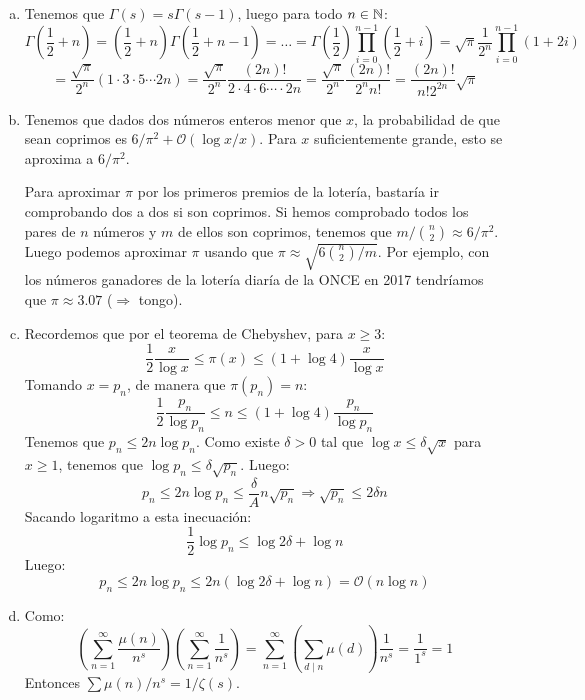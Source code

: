 \documentclass[twoside]{article}
\providecommand{\bo}[1]{\mathcal{O}\left(#1\right)}
\begin{document}
\begin{solucion}
\begin{enumerate}[(a)]
\item Tenemos que $Γ(s)=sΓ(s-1)$, luego para todo $n \in \mathbb{N}$:
	\[ Γ\left(\frac{1}{2}+n\right) = \left(\frac{1}{2}+n\right) Γ\left(\frac{1}{2}+n-1\right) = \dots = Γ\left(\frac{1}{2}\right)\prod_{i=0}^{n-1}\left(\frac{1}{2}+i\right) = \sqrt{π}\frac{1}{2^n}\prod_{i=0}^{n-1}\left(1+2i\right)\]
	\[ = \frac{\sqrt{π}}{2^n}(1 \cdot 3 \cdot 5 \cdots 2n) = \frac{\sqrt{π}}{2^n}\frac{(2n)!}{2 \cdot 4 \cdot 6 \cdots \cdot 2n} = \frac{\sqrt{π}}{2^n}\frac{(2n)!}{2^n n!}  = \frac{(2n)!}{n!2^{2n}}\sqrt{π} \]
	
\item Tenemos que dados dos números enteros menor que $x$, la probabilidad de que sean coprimos es $6/π^2+\bo{\log x/x}$.
	Para $x$ suficientemente grande, esto se aproxima a $6/π^2$.
	
Para aproximar $π$ por los primeros premios de la lotería, bastaría ir comprobando dos a dos si son coprimos.
Si hemos comprobado todos los pares de $n$ números y $m$ de ellos son coprimos, tenemos que $m/\binom{n}{2} \approx 6/π^2$.
Luego podemos aproximar $π$ usando que $π \approx \sqrt{6\binom{n}{2}/m}$.
Por ejemplo, con los números ganadores de la lotería diaría de la ONCE en 2017 tendríamos que $π \approx 3.07$ ($\Rightarrow$ tongo).

\item Recordemos que por el teorema de Chebyshev, para $x ≥ 3$:
\[ \frac{1}{2} \frac{x}{\log x} ≤ π(x) ≤ (1 + \log 4)\frac{x}{\log x} \]
Tomando $x = p_n$, de manera que $π(p_n)=n$:
\[ \frac{1}{2} \frac{p_n}{\log p_n} ≤ n ≤ (1 + \log 4) \frac{p_n}{\log p_n}\]
Tenemos que $p_n ≤ 2 n \log p_n$. Como existe $δ > 0$ tal que $\log x ≤ δ \sqrt{x}$ para $x≥1$, tenemos que $\log p_n ≤ δ\sqrt{p_n}$. Luego:
\[ p_n ≤ 2 n \log p_n ≤ \frac{δ}{A}n\sqrt{p_n} \Rightarrow \sqrt{p_n} ≤ 2δn \]
Sacando logaritmo a esta inecuación:
\[ \frac{1}{2} \log p_n ≤ \log 2δ + \log n\]
Luego:
\[ p_n ≤ 2 n \log p_n ≤ 2n(\log 2δ + \log n) = \mathcal{O}(n\log n) \]

\item Como:
\[ \left(\sum_{n=1}^{∞} \frac{μ(n)}{n^s}\right) \left(\sum_{n=1}^{∞} \frac{1}{n^s}\right) = \sum_{n=1}^{∞} \left(\sum_{d\mid n} μ(d) \right)\frac{1}{n^s} = \frac{1}{1^s} = 1 \]
Entonces $\sum μ(n)/n^s = 1/ζ(s)$.
\end{enumerate}
\end{solucion}

\newpage
\end{document}
